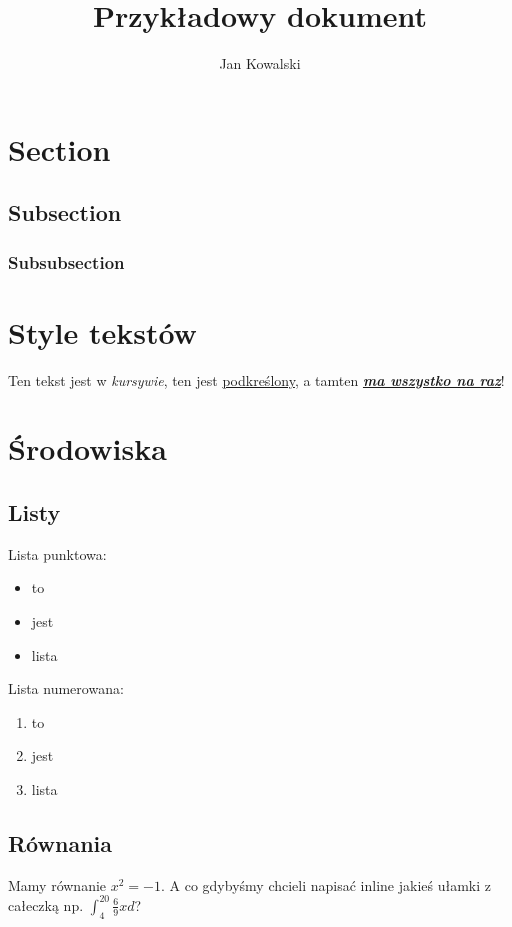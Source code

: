 \documentclass{article}
\begin{document}
\title{Przykładowy dokument}
\author{Jan Kowalski}
\maketitle

\tableofcontents

\section{Section}
\subsection{Subsection}
\subsubsection{Subsubsection}

\lipsum[1-5]

\section{Style tekstów}

Ten tekst jest w \textit{kursywie}, ten jest \underline{podkreślony}, a tamten \textbf{\textit{\underline{ma wszystko na raz}}}!

\section{Środowiska}

\subsection{Listy}

Lista punktowa:
\begin{itemize}
    \item to
    \item jest
    \item lista
\end{itemize}

Lista numerowana:

\begin{enumerate}
    \item to
    \item jest
    \item lista
\end{enumerate}

\subsection{Równania}
Mamy równanie $x^2 = -1$. A co gdybyśmy chcieli napisać inline jakieś ułamki z całeczką np. $\int_{4}^{20} \frac{6}{9} xd$?
\end{document}
